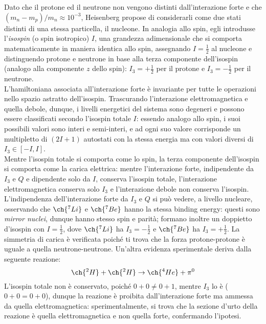 Dato che il protone ed il neutrone non vengono distinti dall'interazione forte e che $ \left( m_n - m_p \right) / m_n \approx 10^{-3} $, Heisenberg propose di considerarli come due stati distinti di una stessa particella, il nucleone. In analogia allo spin, egli introdusse l'\textit{isospin} (o spin isotropico) $ I $, una grandezza adimensionale che si comporta matematicamente in maniera identica allo spin, assegnando $ I = \frac{1}{2} $ al nucleone e distinguendo protone e neutrone in base alla terza componente dell'isospin (analogo alla componente $ z $ dello spin): $ I_3 = +\frac{1}{2} $ per il protone e $ I_3 = -\frac{1}{2} $ per il neutrone.\\
L'hamiltoniana associata all'interazione forte è invariante per tutte le operazioni nello spazio astratto dell'isospin. Trascurando l'interazione elettromagnetica e quella debole, dunque, i livelli energetici del sistema sono degeneri e possono essere classificati secondo l'isospin totale $ I $: essendo analogo allo spin, i suoi possibili valori sono interi e semi-interi, e ad ogni suo valore corrisponde un multipletto di $ (2I + 1) $ autostati con la stessa energia ma con valori diversi di $ I_3 \in \left[ -I, I \right] $.\\
Mentre l'isospin totale si comporta come lo spin, la terza componente dell'isospin si comporta come la carica elettrica: mentre l'interazione forte, indipendente da $ I_3 $ e $ Q $ e dipendente solo da $ I $, conserva l'isospin totale, l'interazione elettromagnetica conserva solo $ I_3 $ e l'interazione debole non conserva l'isospin. L'indipendenza dell'interazione forte da $ I_3 $ e $ Q $ si può vedere, a livello nucleare, osservando che $ \ch{^7Li} $ e $ \ch{^7Be} $ hanno la stessa binding energy: questi sono \textit{mirror nuclei}, dunque hanno stesso spin e parità; formano inoltre un doppietto d'isospin con $ I = \frac{1}{2} $, dove $ \ch{^7Li} $ ha $ I_3 = -\frac{1}{2} $ e $ \ch{^7Be} $ ha $ I_3 = +\frac{1}{2} $. La simmetria di carica è verificata poiché ti trova che la forza protone-protone è uguale a quella neutrone-neutrone. Un'altra evidenza sperimentale deriva dalla seguente reazione:
\begin{equation*}
	\ch{^2H} + \ch{^2H} \rightarrow \ch{^4He} + \pi^0
\end{equation*}
L'isospin totale non è conservato, poiché $ 0 + 0 \neq 0 + 1 $, mentre $ I_3 $ lo è ($ 0 + 0 = 0 + 0 $), dunque la reazione è proibita dall'interazione forte ma ammessa da quella elettromagnetica: sperimentalmente, si trova che la sezione d'urto della reazione è quella elettromagnetica e non quella forte, confermando l'ipotesi.\\

